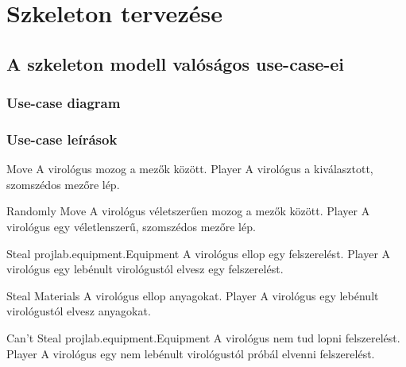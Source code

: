 \chapter{Szkeleton tervezése}


\section{A szkeleton modell valóságos use-case-ei}

\subsection{Use-case diagram}
\pagebreak

\subsection{Use-case leírások}

\begin{use-case}
    {Move}
    {A virológus mozog a mezők között.}
    {Player}
    A virológus a kiválasztott, szomszédos mezőre lép.
\end{use-case}

\begin{use-case}
    {Randomly Move}
    {A virológus véletszerűen mozog a mezők között.}
    {Player}
    A virológus egy véletlenszerű, szomszédos mezőre lép.
\end{use-case}

\begin{use-case}
    {Steal projlab.equipment.Equipment}
    {A virológus ellop egy felszerelést.}
    {Player}
    A virológus egy lebénult virológustól elvesz egy felszerelést.
\end{use-case}

\begin{use-case}
    {Steal Materials}
    {A virológus ellop anyagokat.}
    {Player}
    A virológus egy lebénult virológustól elvesz anyagokat.
\end{use-case}

\begin{use-case}
    {Can't Steal projlab.equipment.Equipment}
    {A virológus nem tud lopni felszerelést.}
    {Player}
    A virológus egy nem lebénult virológustól próbál elvenni felszerelést.
\end{use-case}

